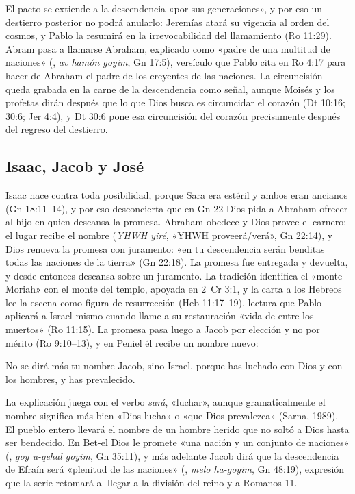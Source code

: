El pacto se extiende a la descendencia «por sus generaciones», y por eso un destierro posterior no podrá anularlo: Jeremías atará su vigencia al orden del cosmos, y Pablo la resumirá en la irrevocabilidad del llamamiento (Ro 11:29). Abram pasa a llamarse Abraham, explicado como «padre de una multitud de naciones» (, \emph{av hamón goyim}, Gn 17:5), versículo que Pablo cita en Ro 4:17 para hacer de Abraham el padre de los creyentes de las naciones. La circuncisión queda grabada en la carne de la descendencia como señal, aunque Moisés y los profetas dirán después que lo que Dios busca es circuncidar el corazón (Dt 10:16; 30:6; Jer 4:4), y Dt 30:6 pone esa circuncisión del corazón precisamente después del regreso del destierro.

\subsection{Isaac, Jacob y José}
Isaac nace contra toda posibilidad, porque Sara era estéril y ambos eran ancianos (Gn 18:11–14), y por eso desconcierta que en Gn 22 Dios pida a Abraham ofrecer al hijo en quien descansa la promesa. Abraham obedece y Dios provee el carnero; el lugar recibe el nombre  (\emph{YHWH yiré}, «YHWH proveerá/verá», Gn 22:14), y Dios renueva la promesa con juramento: «en tu descendencia serán benditas todas las naciones de la tierra» (Gn 22:18). La promesa fue entregada y devuelta, y desde entonces descansa sobre un juramento. La tradición identifica el «monte Moriah» con el monte del templo, apoyada en 2~Cr 3:1, y la carta a los Hebreos lee la escena como figura de resurrección (Heb 11:17–19), lectura que Pablo aplicará a Israel mismo cuando llame a su restauración «vida de entre los muertos» (Ro 11:15). La promesa pasa luego a Jacob por elección y no por mérito (Ro 9:10–13), y en Peniel él recibe un nombre nuevo:

\begin{cita}No se dirá más tu nombre Jacob, sino Israel, porque has luchado con Dios y con los hombres, y has prevalecido.\end{cita}

La explicación juega con el verbo \emph{sará}, «luchar», aunque gramaticalmente el nombre significa más bien «Dios lucha» o «que Dios prevalezca» (Sarna, 1989). El pueblo entero llevará el nombre de un hombre herido que no soltó a Dios hasta ser bendecido. En Bet-el Dios le promete «una nación y un conjunto de naciones» (, \emph{goy u-qehal goyim}, Gn 35:11), y más adelante Jacob dirá que la descendencia de Efraín será «plenitud de las naciones» (, \emph{melo ha-goyim}, Gn 48:19), expresión que la serie retomará al llegar a la división del reino y a Romanos 11.

